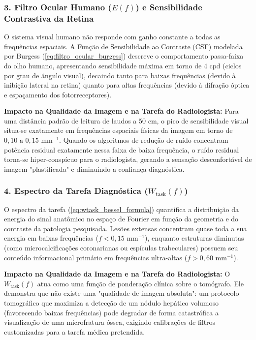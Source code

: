 \documentclass[
  12pt,
  a4paper,
  oneside
]{report}
\begin{document}
\subsubsection{3. Filtro Ocular Humano (\texorpdfstring{$E(f)$}{E(f)}) e Sensibilidade Contrastiva da Retina}
O sistema visual humano não responde com ganho constante a todas as frequências espaciais. A Função de Sensibilidade ao Contraste (CSF) modelada por Burgess \cite{burgess1999} (\cref{eq:filtro_ocular_burgess}) descreve o comportamento passa-faixa do olho humano, apresentando sensibilidade máxima em torno de $4\text{ cpd}$ (ciclos por grau de ângulo visual), decaindo tanto para baixas frequências (devido à inibição lateral na retina) quanto para altas frequências (devido à difração óptica e espaçamento dos fotorreceptores).

\textbf{Impacto na Qualidade da Imagem e na Tarefa do Radiologista:} Para uma distância padrão de leitura de laudos a 50 cm, o pico de sensibilidade visual situa-se exatamente em frequências espaciais físicas da imagem em torno de $0{,}10\text{ a }0{,}15\text{ mm}^{-1}$. Quando os algoritmos de redução de ruído concentram potência residual exatamente nessa faixa de baixa frequência, o ruído residual torna-se hiper-conspícuo para o radiologista, gerando a sensação desconfortável de imagem "plastificada" e diminuindo a confiança diagnóstica.

\subsubsection{4. Espectro da Tarefa Diagnóstica (\texorpdfstring{$W_{\text{task}}(f)$}{Wtask(f)})}
O espectro da tarefa (\cref{eq:wtask_bessel_formula}) quantifica a distribuição da energia do sinal anatômico no espaço de Fourier em função da geometria e do contraste da patologia pesquisada. Lesões extensas concentram quase toda a sua energia em baixas frequências ($f < 0{,}15\text{ mm}^{-1}$), enquanto estruturas diminutas (como microcalcificações coronarianas ou espículas trabeculares) possuem seu conteúdo informacional primário em frequências ultra-altas ($f > 0{,}60\text{ mm}^{-1}$).

\textbf{Impacto na Qualidade da Imagem e na Tarefa do Radiologista:} O $W_{\text{task}}(f)$ atua como uma função de ponderação clínica sobre o tomógrafo. Ele demonstra que não existe uma "qualidade de imagem absoluta": um protocolo tomográfico que maximiza a detecção de um nódulo hepático volumoso (favorecendo baixas frequências) pode degradar de forma catastrófica a visualização de uma microfratura óssea, exigindo calibrações de filtros customizadas para a tarefa médica pretendida.
\end{document}
